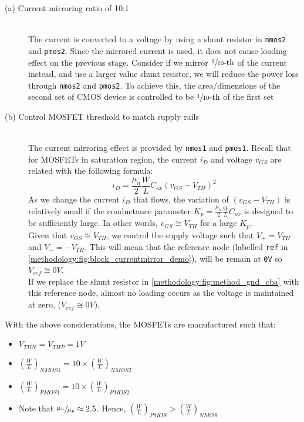 \begin{description} %
  \item[(a) Current mirroring ratio of 10:1] \text{}\\
  The current is converted to a voltage by using a shunt resistor in \verb|nmos2| and \verb|pmos2|. Since the mirrored current is used, it does not cause loading effect on the previous stage. 
  Consider if we mirror $\sfrac{1}{10}\text{-th}$ of the current instead, and use a larger value shunt resistor, we will reduce the power loss through \verb|nmos2| and \verb|pmos2|.
  To achieve this, the area/dimensions of the second set of CMOS device is controlled to be $\sfrac{1}{10}\text{-th}$ of the first set

  \item[(b) Control MOSFET threshold to match supply rails] \text{}\\
  The current mirroring effect is provided by \verb|nmos1| and \verb|pmos1|. Recall that for MOSFETs in saturation region, the current $i_D$ and voltage $v_{GS}$ are related with the following formula:
  $$
  i_D=\frac{\mu_n}{2}\frac{W}{L}C_{ox}\left(v_{GS}-V_{TH}\right)^{2}
  $$
  As we change the current $i_D$ that flows, the variation of $\left(v_{GS}-V_{TH}\right)$ is relatively small if the conductance parameter $K_p=\frac{\mu_n}{2}\frac{W}{L}C_{ox}$ is designed to be sufficiently large. In other words, $v_{GS} \cong V_{TH}$ for a large $K_p$.
  \\
  Given that $v_{GS} \cong V_{TH}$, we control the supply voltage such that $V_+ = V_{TH}$ and $V_- = -V_{TH}$. This will mean that the reference node (labelled \verb|ref| in \autoref{methodology:fig:block_currentmirror_demo}), will be remain at \verb|0V| so $V_{ref} \cong 0V$.
  \\
  If we replace the shunt resistor in \autoref{methodology:fig:method_gnd_cba} with this reference node, almost no loading occurs as the voltage is maintained at zero, ($V_{ref} \cong 0V$).
\end{description}

\noindent
With the above considerations, the MOSFETs are manufactured such that:

\begin{itemize}
  \item $V_{THN}=V_{THP}=1V$
  \item $ \left(\frac{W}{L}\right)_{NMOS1} = 10 \times \left(\frac{W}{L}\right)_{NMOS2}$
  \item $ \left(\frac{W}{L}\right)_{PMOS1} = 10 \times \left(\frac{W}{L}\right)_{PMOS2}$
  \item Note that $\sfrac{\mu_n}{\mu_p} \approx 2.5$. Hence, $\left(\frac{W}{L}\right)_{PMOS} > \left(\frac{W}{L}\right)_{NMOS}$
\end{itemize}

